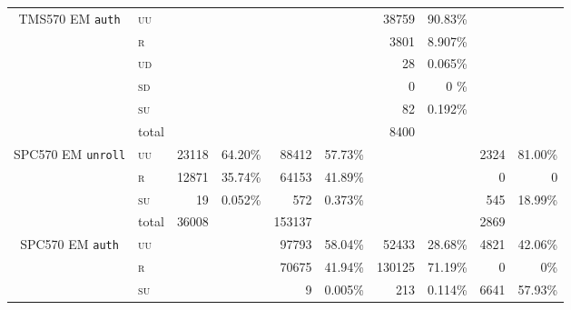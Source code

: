 \documentclass[10pt]{article}
\newcommand{\TI}{TMS570\xspace}
\newcommand{\ST}{SPC570\xspace}
\newcommand{\unroll}{\texttt{unroll}\xspace}
\newcommand{\auth}{\texttt{auth}\xspace}
\newcommand{\UU}{\textsc{uu}\xspace}
\newcommand{\UD}{\textsc{ud}\xspace}
\newcommand{\SU}{\textsc{su}\xspace}
\newcommand{\SD}{\textsc{sd}\xspace}
\newcommand{\R}{\textsc{r}\xspace}
\begin{document}
\begin{appendices}
\begin{table}[H]
\begin{tabular}{ll rr rr rr rr}
    \midrule

    \multicolumn{1}{c}{\multirow{3}{*}{ \parbox{2cm}{\TI EM \auth}}}

    & \UU    
    & & 
    & & 
    & 38759  & 90.83\%  
    & &                            
    \\
    & \R   
    & & 
    & & 
    & 3801   & 8.907\%  
    & &                            
    \\
    & \UD  
    & & 
    & & 
    & 28     & 0.065\%  
    & &                            
    \\
    & \SD     
    & & 
    & & 
    & 0      & 0    \%  
    & &                            
     \\
    & \SU      
    & & 
    & & 
    & 82     & 0.192\%  
    & &                            
    \\

    \cmidrule(l){2-10}
    & total    
    & & 
    & & 
    & 8400   &           
    & &                            
      \\   
   
    \midrule

    \multicolumn{1}{c}{\multirow{3}{*}{ \parbox{2cm}{\ST EM \unroll}}}

    & \UU    
    & 23118  & 64.20\%
    & 88412  & 57.73\%  
    & & 
    & 2324 & 81.00\%                          
    \\
    & \R   
    & 12871  & 35.74\%
    & 64153  & 41.89\%  
    & & 
    & 0 & 0%
    \\
    & \SU      
    & 19     & 0.052\%
    & 572    & 0.373\%  
    & & 
    & 545 & 18.99\%                           
    \\

    \cmidrule(l){2-10}
    & total    
    &  36008  &           
    & 153137 & 
    &  & 
    & 2869&                           
      \\      

    \midrule

    \multicolumn{1}{c}{\multirow{3}{*}{ \parbox{2cm}{\ST EM \auth}}}

    & \UU    
    & & 
    & 97793  & 58.04\%        
    & 52433   & 28.68\%  
    & 4821 &   42.06\%        
    \\
    & \R   
    & & 
    & 70675  & 41.94\%        
    & 130125  & 71.19\%  
    & 0 &       0\%    
    \\
    & \SU      
    & & 
    &  9     & 0.005\%        
    &  213   & 0.114\%  
    & 6641   & 57.93\%           
    \\


\end{tabular}
\end{table}
\end{appendices}
\end{document}
